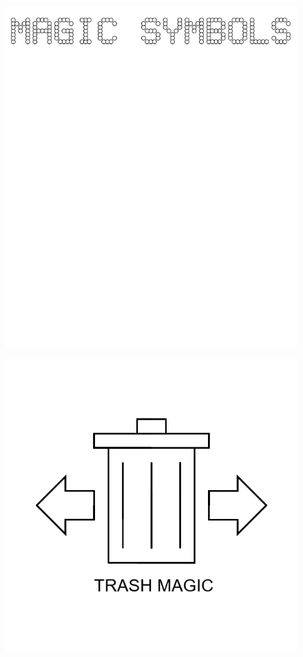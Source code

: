 \documentclass[17pt]{extreport}
\begin{document}
	\begin{figure}
		\centering
		\includegraphics[width=6.25in]{imageserver/uploadimages/magicsymbols.png}
	\end{figure}

	
	\begin{figure}
		\centering
		\includegraphics[width=6.25in]{imageserver/uploadimages/image13.png}
	\end{figure}
	
\end{document}
